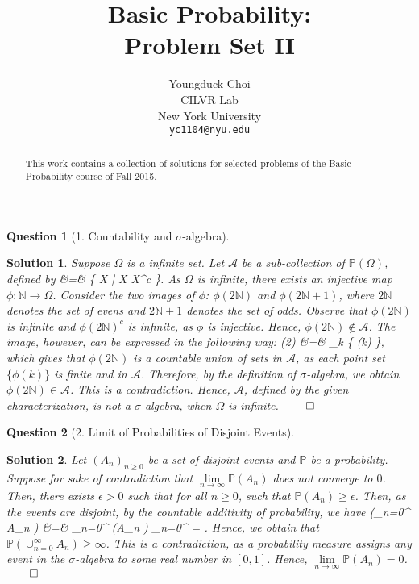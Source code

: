 \documentclass{article} %
\title{Basic Probability: \\
Problem Set II}
\author{
Youngduck Choi \\
CILVR Lab \\
New York University\\
\texttt{yc1104@nyu.edu} \\
}
\def\eQb#1\eQe{\begin{eqnarray*}#1\end{eqnarray*}}
\theoremstyle{quest}
\newtheorem*{question}{Question}
\newtheorem*{solution}{Solution}
\begin{document}
\maketitle

\begin{abstract}
This work contains a collection of solutions for selected problems 
of the Basic Probability course of Fall 2015.
\end{abstract}

\begin{question}[1. Countability and $\sigma$-algebra]
\end{question}
\begin{solution}
Suppose $\Omega$ is a infinite set. Let $\mathscr{A}$ be a sub-collection of $\mathbb{P}(\Omega)$, 
defined by 
\eQb
\mathscr{A} &=& \{ X \subseteq \Omega \> | \> X  X^c  \}. 
\eQe
As $\Omega$ is infinite, there exists an injective map $\phi:\mathbb{N} \to \Omega$. Consider
the two images of $\phi$: $\phi(2\mathbb{N})$ and $\phi(2\mathbb{N}+1)$, where $2\mathbb{N}$
denotes the set of evens and $2\mathbb{N}+1$ denotes the set of odds. Observe that
$\phi(2\mathbb{N})$ is infinite and $\phi(2\mathbb{N})^c$ is infinite, as $\phi$ is injective.
Hence, $\phi(2\mathbb{N}) \notin \mathscr{A}$. The image, however, can be expressed in the following
way:
\eQb
\phi(2) &=& \bigcup_{k } \{ \phi(k) \},
\eQe
which gives that $\phi(2\mathbb{N})$ is a countable union of sets in $\mathscr{A}$, as
each point set $\{ \phi(k) \} $ is finite and in $\mathscr{A}$.
Therefore, by the definition of $\sigma$-algebra, we obtain $\phi(2\mathbb{N}) \in \mathscr{A}$.
This is a contradiction.
Hence, $\mathscr{A}$, defined by the
given characterization, is not a $\sigma$-algebra, when
$\Omega$ is infinite. $\qed$

\end{solution}

\bigskip

\begin{question}[2. Limit of Probabilities of Disjoint Events]
\end{question}
\begin{solution}
Let $( A_n )_{n \geq 0}$ be a set of disjoint events and $\mathbb{P}$ be a probability.
Suppose for sake of contradiction that $\underset{n \to \infty}{\lim} \mathbb{P}(A_n )$
does not converge to $0$. Then, there exists $\epsilon > 0$ such that for all $n \geq 0$,
such that $\mathbb{P}(A_n ) \geq \epsilon$. Then, 
as the events are disjoint, by the countable additivity of probability,
we have 
\eQb
\mathbb{P}(\cup_{n=0}^{\infty} A_n ) &=& \sum_{n=0}^{\infty} (A_n ) 
\geq \sum_{n=0}^{\infty} \epsilon = \infty. 
\eQe
Hence, we obtain that $\mathbb{P}(\cup_{n=0}^{\infty} A_n) \geq \infty$. This is a contradiction,
as a probability measure assigns any event in the $\sigma$-algebra to some real number in $[0,1]$.
Hence, $\underset{n \to \infty}{\lim} \mathbb{P}(A_n) = 0$. $\qed$
\end{solution}
\end{document}
